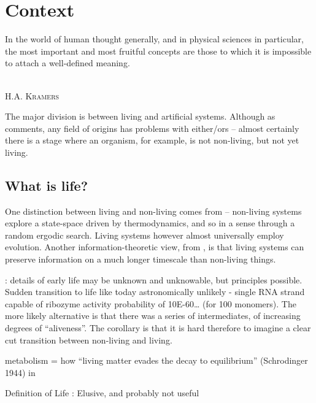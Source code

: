 \chapter{Context}\label{context}

\epigraph{%
In the world of human thought generally, and in physical sciences in particular, the most important and most fruitful concepts are those to which it is impossible to attach a well-defined meaning.}%
{\textsc{\\H.A. Kramers}}

The major division is between living and artificial systems. Although as \autocite{Bruylants2010} comments, any field of origins has problems with either/ors -- almost certainly there is a stage where an organism, for example, is not non-living, but not yet living.

\section{What is life?}\label{what-is-life}

One distinction between living and non-living comes from \autocite{Rasmussen2004} -- non-living systems explore a state-space driven by thermodynamics, and so in a sense through a random ergodic search. Living systems however almost universally employ evolution. Another information-theoretic view, from \autocite{Adami2015}, is that living systems can preserve information on a much longer timescale than non-living things.

\autocite{Pascal2013}: details of early life may be unknown and unknowable, but principles possible. Sudden transition to life like today astronomically unlikely - single RNA strand capable of ribozyme activity probability of 10E-60\ldots{} (for 100 monomers). The more likely alternative is that there was a series of intermediates, of increasing degrees of ``aliveness''. The corollary is that it is hard therefore to imagine a clear cut transition between non-living and living.

			metabolism = how ``living matter evades the decay to equilibrium''
			(Schrodinger 1944) in \autocite{Pascal2013}

			Definition of Life  \autocite{Pascal2013}: Elusive, and probably not useful
			
